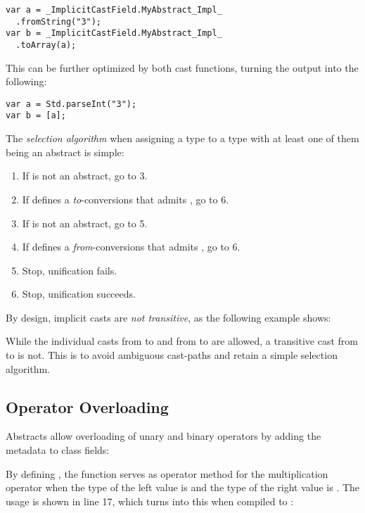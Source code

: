 {\begin{lstlisting}
var a = _ImplicitCastField.MyAbstract_Impl_
  .fromString("3");
var b = _ImplicitCastField.MyAbstract_Impl_
  .toArray(a);
\end{lstlisting}
This can be further optimized by  both cast functions, turning the output into the following:

\begin{lstlisting}
var a = Std.parseInt("3");
var b = [a];
\end{lstlisting}
The \emph{selection algorithm} when assigning a type  to a type  with at least one of them being an abstract is simple:

\begin{enumerate}
	\item If  is not an abstract, go to 3.
	\item If  defines a \emph{to}-conversions that admits , go to 6.
	\item If  is not an abstract, go to 5.
	\item If  defines a \emph{from}-conversions that admits , go to 6.
	\item Stop, unification fails.
	\item Stop, unification succeeds.
\end{enumerate}



By design, implicit casts are \emph{not transitive}, as the following example shows:

While the individual casts from  to  and from  to  are allowed, a transitive cast from  to  is not. This is to avoid ambiguous cast-paths and retain a simple selection algorithm. 




\subsection{Operator Overloading}
\label{types-abstract-operator-overloading}

Abstracts allow overloading of unary and binary operators by adding the  metadata to class fields:

By defining , the function  serves as operator method for the multiplication \expr{*} operator when the type of the left value is  and the type of the right value is . The usage is shown in line 17, which turns into this when compiled to :

}
